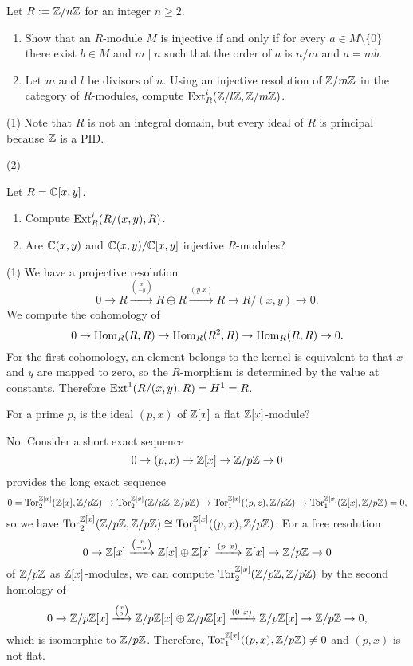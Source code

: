 \documentclass{../../../small}
\begin{document}
\begin{prb}
Let $R:=\mathbb{Z}/n\mathbb{Z}$ for an integer $n\ge2$.
\begin{enumerate}[(1)]
\item Show that an $R$-module $M$ is injective if and only if for every $a\in M\setminus\{0\}$ there exist $b\in M$ and $m\mid n$ such that the order of $a$ is $n/m$ and $a=mb$.
\item Let $m$ and $l$ be divisors of $n$. Using an injective resolution of $\mathbb{Z}/m\mathbb{Z}$ in the category of $R$-modules, compute $\operatorname{Ext}_R^i(\mathbb{Z}/l\mathbb{Z},\mathbb{Z}/m\mathbb{Z})$.
\end{enumerate}
\end{prb}
\begin{sol}
(1)
Note that $R$ is not an integral domain, but every ideal of $R$ is principal because $\mathbb{Z}$ is a PID.

(2)

\end{sol}

\begin{prb}
Let $R=\mathbb{C}[x,y]$.
\begin{enumerate}[(1)]
\item Compute $\operatorname{Ext}_R^i(R/(x,y),R)$.
\item Are $\mathbb{C}(x,y)$ and $\mathbb{C}(x,y)/\mathbb{C}[x,y]$ injective $R$-modules?
\end{enumerate}
\end{prb}
\begin{sol}
(1)
We have a projective resolution
\[0\to R\xrightarrow{x\choose -y} R\oplus R\xrightarrow{(y\ x)}R\to R/(x,y)\to0.\]
We compute the cohomology of
\[0\to\operatorname{Hom}_R(R,R)\to\operatorname{Hom}_R(R^2,R)\to\operatorname{Hom}_R(R,R)\to0.\]
For the first cohomology, an element belongs to the kernel is equivalent to that $x$ and $y$ are mapped to zero, so the $R$-morphism is determined by the value at constants.
Therefore $\operatorname{Ext}^1(R/(x,y),R)=H^1=R$.

\end{sol}

\begin{prb}
For a prime $p$, is the ideal $(p,x)$ of $\mathbb{Z}[x]$ a flat $\mathbb{Z}[x]$-module?
\end{prb}
\begin{sol}
No.
Consider a short exact sequence
\[0\to(p,x)\to\mathbb{Z}[x]\to\mathbb{Z}/p\mathbb{Z}\to0\]
provides the long exact sequence
\[0=\operatorname{Tor}_2^{\mathbb{Z}[x]}(\mathbb{Z}[x],\mathbb{Z}/p\mathbb{Z})\to\operatorname{Tor}_2^{\mathbb{Z}[x]}(\mathbb{Z}/p\mathbb{Z},\mathbb{Z}/p\mathbb{Z})\to\operatorname{Tor}_1^{\mathbb{Z}[x]}((p,z),\mathbb{Z}/p\mathbb{Z})\to\operatorname{Tor}_1^{\mathbb{Z}[x]}(\mathbb{Z}[x],\mathbb{Z}/p\mathbb{Z})=0,\]
so we have $\operatorname{Tor}_2^{\mathbb{Z}[x]}(\mathbb{Z}/p\mathbb{Z},\mathbb{Z}/p\mathbb{Z})\cong\operatorname{Tor}_1^{\mathbb{Z}[x]}((p,x),\mathbb{Z}/p\mathbb{Z})$.
For a free resolution
\[0\to\mathbb{Z}[x]\xrightarrow{x\choose -p}\mathbb{Z}[x]\oplus\mathbb{Z}[x]\xrightarrow{(p\ x)}\mathbb{Z}[x]\to\mathbb{Z}/p\mathbb{Z}\to0\]
of $\mathbb{Z}/p\mathbb{Z}$ as $\mathbb{Z}[x]$-modules, we can compute $\operatorname{Tor}_2^{\mathbb{Z}[x]}(\mathbb{Z}/p\mathbb{Z},\mathbb{Z}/p\mathbb{Z})$ by the second homology of
\[0\to\Z/p\Z[x]\xrightarrow{x\choose 0}\Z/p\Z[x]\oplus\Z/p\Z[x]\xrightarrow{(0\ x)}\Z/p\Z[x]\to\Z/p\Z\to0,\]
which is isomorphic to $\mathbb{Z}/p\mathbb{Z}$.
Therefore, $\operatorname{Tor}_1^{\mathbb{Z}[x]}((p,x),\mathbb{Z}/p\mathbb{Z})\ne0$ and $(p,x)$ is not flat.
\end{sol}
\end{document}
